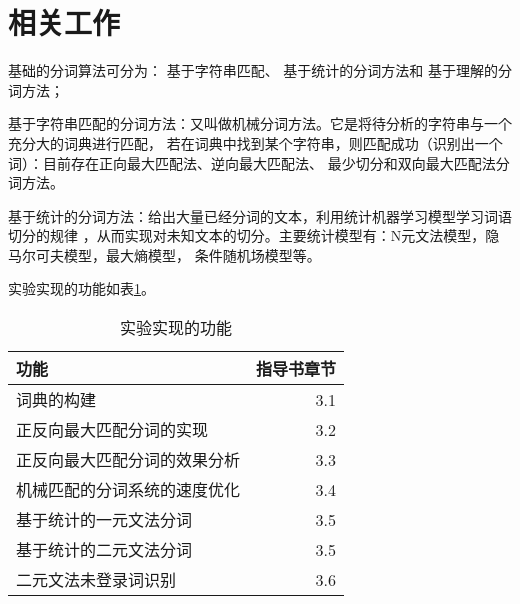 \section{相关工作}

基础的分词算法可分为：
基于字符串匹配\citep{张启宇2008中文分词算法研究综述}、
基于统计的分词方法\citep{刘件2008中文分词算法研究}和
基于理解的分词方法\citep{汪文妃2018中文分词算法研究综述}；

基于字符串匹配的分词方法：又叫做机械分词方法。它是将待分析的字符串与一个充分大的词典进行匹配，
若在词典中找到某个字符串，则匹配成功（识别出一个词）：目前存在正向最大匹配法、逆向最大匹配法、
最少切分和双向最大匹配法分词方法。

基于统计的分词方法：给出大量已经分词的文本，利用统计机器学习模型学习词语切分的规律
，从而实现对未知文本的切分。主要统计模型有：N元文法模型，隐马尔可夫模型，最大熵模型，
条件随机场模型等。

实验实现的功能如表\ref{achieved-features}。

\begin{table}[H]
  \centering
  \begin{tabular}{lr}
    \hline
    \textbf{功能}                & \textbf{指导书章节} \\
    \hline
    词典的构建                   & 3.1                 \\
    正反向最大匹配分词的实现     & 3.2                 \\
    正反向最大匹配分词的效果分析 & 3.3                 \\
    机械匹配的分词系统的速度优化 & 3.4                 \\
    基于统计的一元文法分词       & 3.5                 \\
    基于统计的二元文法分词       & 3.5                 \\
    二元文法未登录词识别         & 3.6                 \\
    \hline
  \end{tabular}
  \caption{实验实现的功能}
  \label{achieved-features}
\end{table}
